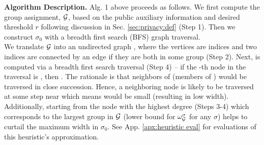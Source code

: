 \textbf{Algorithm Description.}
Alg. 1 above proceeds as follows. We first compute the group assignment, $\mathcal{G}$, based on the public auxiliary information and desired threshold $r$ following discussion in Sec. \ref{sec:privacy:def} (Step 1). Then we construct $\sigma_0$ with a breadth first search (BFS) graph traversal. 
\\We translate $\mathcal{G}$ into an undirected graph \scalebox{0.9}{$(V,E)$}, where the vertices are indices \scalebox{0.9}{$V = [n]$} and two indices \scalebox{0.9}{$i,j$} are connected by an edge if they are both in some group (Step 2). Next, \scalebox{0.9}{$\sigma_0$} is computed via a breadth first search traversal (Step 4) --  if the \scalebox{0.9}{$k$}-th node in the traversal is \scalebox{0.9}{$i$}, then \scalebox{0.9}{$\sigma_0(k) = i$}. The rationale is that neighbors of \scalebox{0.9}{$i$} (members of \scalebox{0.9}{$G_i$}) would be traversed in close succession. Hence, a neighboring node \scalebox{0.9}{$j$} is likely to be traversed at some step \scalebox{0.9}{$h$} near \scalebox{0.9}{$k$} which means  would be small (resulting in low width). Additionally, starting from the node with the highest degree (Steps 3-4) which corresponds to the largest group in $\mathcal{G}$ (lower bound for $\omega_{\mathcal{G}}^{\sigma}$ for any  $\sigma$) helps to curtail the maximum width in $\sigma_0$. See App. \ref{apx:heuristic eval} for evaluations of this heuristic's approximation.  

